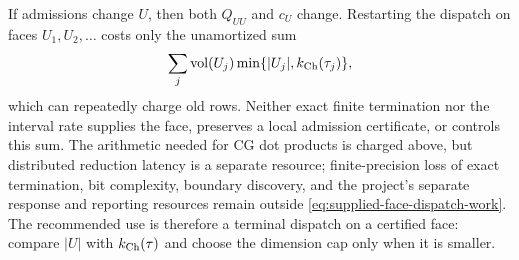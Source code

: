 If admissions change $U$, then both $Q_{UU}$ and $c_U$ change.  Restarting
the dispatch on faces $U_1,U_2,\ldots$ costs only the unamortized sum
\begin{equation}
 \sum_j\operatorname{vol}(U_j)
 \min\{|U_j|,k_{\rm Ch}(\tau_j)\},
 \label{eq:supplied-face-restart-sum}
\end{equation}
which can repeatedly charge old rows.  Neither exact finite termination nor
the interval rate supplies the face, preserves a local admission certificate,
or controls this sum.  The arithmetic needed for CG dot products is charged
above, but distributed reduction latency is a separate resource;
finite-precision loss of exact termination, bit complexity, boundary
discovery, and the project's separate response and reporting resources remain outside
\eqref{eq:supplied-face-dispatch-work}.  The recommended use is therefore a
terminal dispatch on a certified face: compare $|U|$ with
$k_{\rm Ch}(\tau)$ and choose the dimension cap only when it is smaller.
